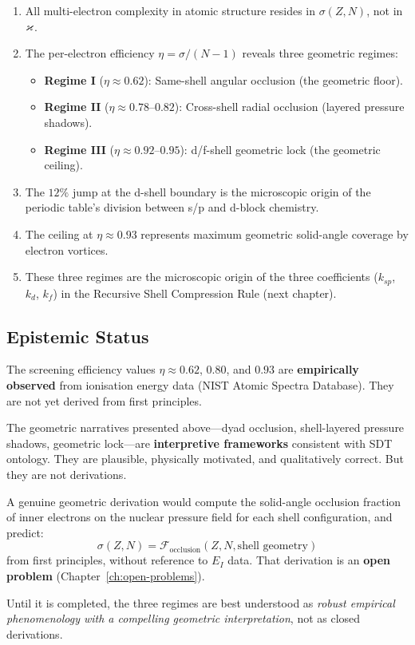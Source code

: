 \begin{enumerate}
  \item All multi-electron complexity in atomic structure resides in $\sigma(Z, N)$, not in $\varkappa$.
  \item The per-electron efficiency $\eta = \sigma/(N{-}1)$ reveals three geometric regimes:
    \begin{itemize}
      \item \textbf{Regime I} ($\eta \approx 0.62$): Same-shell angular occlusion (the geometric floor).
      \item \textbf{Regime II} ($\eta \approx 0.78\text{--}0.82$): Cross-shell radial occlusion (layered pressure shadows).
      \item \textbf{Regime III} ($\eta \approx 0.92\text{--}0.95$): d/f-shell geometric lock (the geometric ceiling).
    \end{itemize}
  \item The $12\%$ jump at the d-shell boundary is the microscopic origin of the periodic table's division between s/p and d-block chemistry.
  \item The ceiling at $\eta \approx 0.93$ represents maximum geometric solid-angle coverage by electron vortices.
  \item These three regimes are the microscopic origin of the three coefficients ($k_{sp}$, $k_d$, $k_f$) in the Recursive Shell Compression Rule (next chapter).
\end{enumerate}

\subsection{Epistemic Status}

The screening efficiency values $\eta \approx 0.62$, $0.80$, and $0.93$ are \textbf{empirically observed} from ionisation energy data (NIST Atomic Spectra Database).  They are not yet derived from first principles.

The geometric narratives presented above---dyad occlusion, shell-layered pressure shadows, geometric lock---are \textbf{interpretive frameworks} consistent with SDT ontology.  They are plausible, physically motivated, and qualitatively correct.  But they are not derivations.

A genuine geometric derivation would compute the solid-angle occlusion fraction of inner electrons on the nuclear pressure field for each shell configuration, and predict:
\begin{equation}
  \sigma(Z, N) = \mathcal{F}_{\text{occlusion}}(Z, N, \text{shell geometry})
\end{equation}
from first principles, without reference to $E_I$ data.  That derivation is an \textbf{open problem} (Chapter~\ref{ch:open-problems}).

Until it is completed, the three regimes are best understood as \emph{robust empirical phenomenology with a compelling geometric interpretation}, not as closed derivations.

